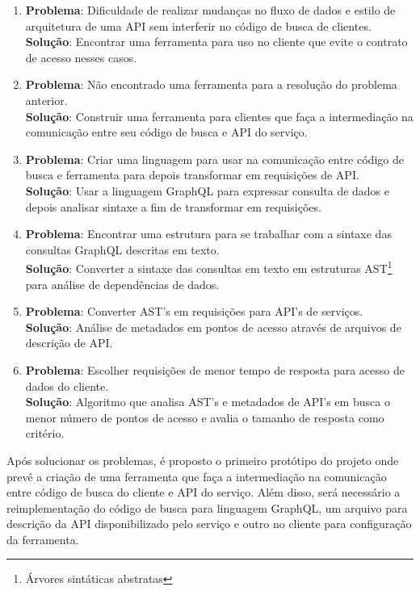 \begin{enumerate}
\item \textbf{Problema}: Dificuldade de realizar mudanças no fluxo de dados e estilo de arquitetura de uma API sem interferir no código de busca de clientes. \\ \textbf{Solução}: Encontrar uma ferramenta para uso no cliente que evite o contrato de acesso nesses casos.
\item \textbf{Problema}: Não encontrado uma ferramenta para a resolução do problema anterior. \\ \textbf{Solução}: Construir uma ferramenta para clientes que faça a intermediação na comunicação entre seu código de busca e API do serviço.
\item \textbf{Problema}: Criar uma linguagem para usar na comunicação entre código de busca e ferramenta para depois transformar em requisições de API. \\ \textbf{Solução}: Usar a linguagem GraphQL para expressar consulta de dados e depois analisar sintaxe a fim de transformar em requisições.
\item \textbf{Problema}: Encontrar uma estrutura para se trabalhar com a sintaxe das consultas GraphQL descritas em texto. \\ \textbf{Solução}: Converter a sintaxe das consultas em texto em estruturas AST\footnote{
  Árvores sintáticas abstratas
} para análise de dependências de dados.
\item \textbf{Problema}: Converter AST's em requisições para API's de serviços. \\ \textbf{Solução}: Análise de metadados em pontos de acesso através de arquivos de descrição de API.
\item \textbf{Problema}: Escolher requisições de menor tempo de resposta para acesso de dados do cliente. \\ \textbf{Solução}: Algoritmo que analisa AST's e metadados de API's em busca o menor número de pontos de acesso e avalia o tamanho de resposta como critério.
\end{enumerate}

Após solucionar os problemas, é proposto o primeiro protótipo do projeto onde prevê a criação de uma ferramenta que faça a intermediação na comunicação entre código de busca do cliente e API do serviço. Além disso, será necessário a reimplementação do código de busca para linguagem GraphQL, um arquivo para descrição da API disponibilizado pelo serviço e outro no cliente para configuração da ferramenta.

